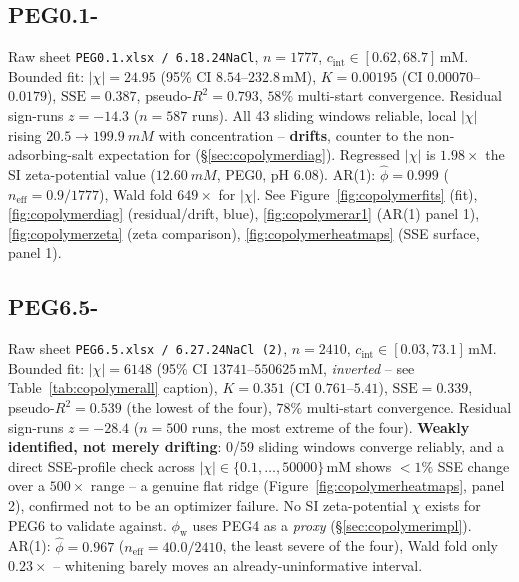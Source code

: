 \documentclass[11pt]{article}
\newcommand{\cint}{c_{\mathrm{int}}}
\newcommand{\SSE}{\mathrm{SSE}}
\begin{document}
\subsection{PEG0.1-}\label{sec:app-copolymer-peg01nacl}
Raw sheet \texttt{PEG0.1.xlsx / 6.18.24NaCl}, $n=1777$,
$\cint\in[0.62,68.7]$\,mM. Bounded fit: $|\chi|=24.95$ (95\% CI
$8.54$--$232.8$\,mM), $K=0.00195$ (CI $0.00070$--$0.0179$), $\SSE=0.387$,
pseudo-$R^2=0.793$, $58\%$ multi-start convergence. Residual sign-runs
$z=-14.3$ ($n=587$ runs). All 43 sliding windows reliable, local $|\chi|$
rising $20.5\to\SI{199.9}{mM}$ with concentration -- \textbf{drifts},
counter to the non-adsorbing-salt expectation for 
(\S\ref{sec:copolymerdiag}). Regressed $|\chi|$ is $1.98\times$ the SI
zeta-potential value ($\SI{12.60}{mM}$, PEG0, pH 6.08). AR(1): $\hat\phi=0.999$
($n_{\mathrm{eff}}=0.9/1777$), Wald fold $649\times$ for $|\chi|$. See
Figure~\ref{fig:copolymerfits} (fit), \ref{fig:copolymerdiag} (residual/drift,
blue), \ref{fig:copolymerar1} (AR(1) panel 1), \ref{fig:copolymerzeta} (zeta
comparison), \ref{fig:copolymerheatmaps} (SSE surface, panel 1).

\subsection{PEG6.5-}\label{sec:app-copolymer-peg65nacl}
Raw sheet \texttt{PEG6.5.xlsx / 6.27.24NaCl (2)}, $n=2410$,
$\cint\in[0.03,73.1]$\,mM. Bounded fit: $|\chi|=6148$ (95\% CI $13741$--$550625$\,mM,
\emph{inverted} -- see Table~\ref{tab:copolymerall} caption), $K=0.351$ (CI
$0.761$--$5.41$), $\SSE=0.339$, pseudo-$R^2=0.539$ (the lowest of the four),
$78\%$ multi-start convergence. Residual sign-runs $z=-28.4$ ($n=500$ runs,
the most extreme of the four). \textbf{Weakly identified, not merely
drifting}: 0/59 sliding windows converge reliably, and a direct SSE-profile
check across $|\chi|\in\{0.1,\ldots,50000\}$\,mM shows $<1\%$ SSE change over
a $500\times$ range -- a genuine flat ridge (Figure~\ref{fig:copolymerheatmaps},
panel 2), confirmed not to be an optimizer failure. No SI zeta-potential
$\chi$ exists for PEG6 to validate against. $\phi_{\mathrm w}$ uses PEG4 as a
\emph{proxy} (\S\ref{sec:copolymerimpl}). AR(1): $\hat\phi=0.967$
($n_{\mathrm{eff}}=40.0/2410$, the least severe of the four), Wald fold only
$0.23\times$ -- whitening barely moves an already-uninformative interval.
\end{document}
